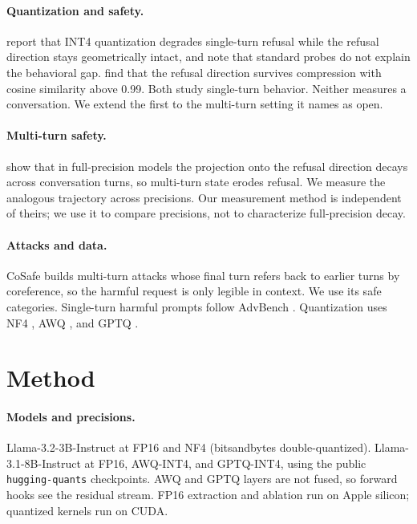 \documentclass[letterpaper]{article} %
\begin{document}
\paragraph{Quantization and safety.}
\citet{kadadekar2026quality} report that INT4 quantization degrades single-turn
refusal while the refusal direction stays geometrically intact, and note that
standard probes do not explain the behavioral gap. \citet{chhabra2025refusal}
find that the refusal direction survives compression with cosine similarity
above 0.99. Both study single-turn behavior. Neither measures a conversation.
We extend the first to the multi-turn setting it names as open.

\paragraph{Multi-turn safety.}
\citet{star2026state} show that in full-precision models the projection onto the
refusal direction decays across conversation turns, so multi-turn state erodes
refusal. We measure the analogous trajectory across precisions. Our measurement
method is independent of theirs; we use it to compare precisions, not to
characterize full-precision decay.

\paragraph{Attacks and data.}
CoSafe \citep{yu2024cosafe} builds multi-turn attacks whose final turn refers
back to earlier turns by coreference, so the harmful request is only legible in
context. We use its safe categories. Single-turn harmful prompts follow AdvBench
\citep{zou2023universal}. Quantization uses NF4 \citep{dettmers2023qlora}, AWQ
\citep{lin2024awq}, and GPTQ \citep{frantar2023gptq}.

\section{Method}
\paragraph{Models and precisions.}
Llama-3.2-3B-Instruct at FP16 and NF4 (bitsandbytes double-quantized). Llama-3.1-8B-Instruct
at FP16, AWQ-INT4, and GPTQ-INT4, using the public \texttt{hugging-quants}
checkpoints. AWQ and GPTQ layers are not fused, so forward hooks see the residual
stream. FP16 extraction and ablation run on Apple silicon; quantized kernels run
on CUDA.
\end{document}
